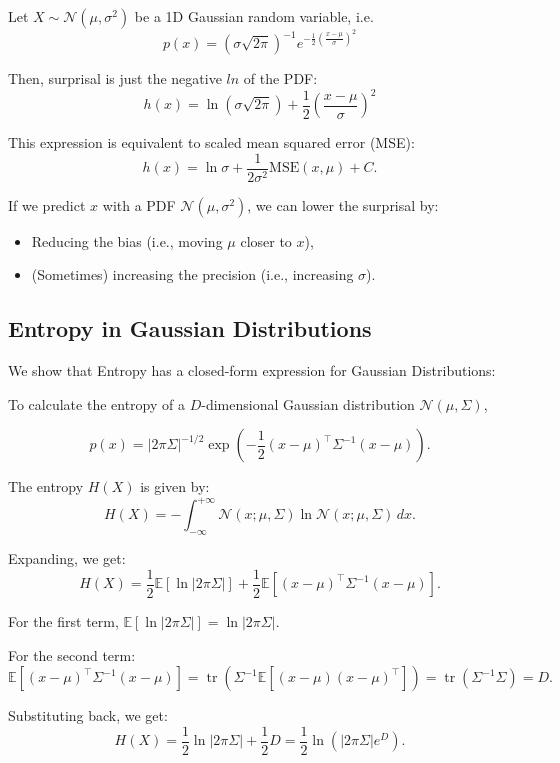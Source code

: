 Let \( X \sim \mathcal{N}(\mu, \sigma^2) \) be a 1D Gaussian random variable, i.e.
\[
p(x) = \left( \sigma \sqrt{2 \pi} \right)^{-1} e^{-\frac{1}{2} \left( \frac{x - \mu}{\sigma} \right)^2}
\]


Then, surprisal is just the negative $ln$ of the PDF:
\[
h(x) = \ln \left( \sigma \sqrt{2 \pi} \right) + \frac{1}{2} \left( \frac{x - \mu}{\sigma} \right)^2
\]

This expression is equivalent to scaled mean squared error (MSE):
\[
h(x) = \ln \sigma + \frac{1}{2 \sigma^2} \text{MSE}(x, \mu) + C.
\]

If we predict \( x \) with a PDF \( \mathcal{N}(\mu, \sigma^2) \), we can lower the surprisal by:

\begin{itemize}
    \item Reducing the bias (i.e., moving \( \mu \) closer to \( x \)),
    \item (Sometimes) increasing the precision (i.e., increasing \( \sigma \)).
\end{itemize}


\subsection{Entropy in Gaussian Distributions}

We show that Entropy has a closed-form expression for Gaussian Distributions:

To calculate the entropy of a \(D\)-dimensional Gaussian distribution \(\mathcal{N}(\mu, \Sigma)\),

\[
p(x) = |2 \pi \Sigma|^{-1/2} \exp \left( -\frac{1}{2} (x - \mu)^\top \Sigma^{-1} (x - \mu) \right).
\]

The entropy \(H(X)\) is given by:
\[
H(X) = - \int_{-\infty}^{+\infty} \mathcal{N}(x; \mu, \Sigma) \ln \mathcal{N}(x; \mu, \Sigma) \, dx.
\]

Expanding, we get:
\[
H(X) = \frac{1}{2} \mathbb{E}[\ln |2 \pi \Sigma|] + \frac{1}{2} \mathbb{E}[(x - \mu)^\top \Sigma^{-1} (x - \mu)].
\]

For the first term, \(\mathbb{E}[\ln |2 \pi \Sigma|] = \ln |2 \pi \Sigma|\).

For the second term:
\[
\mathbb{E} \left[ (x - \mu)^\top \Sigma^{-1} (x - \mu) \right] = \operatorname{tr} \left( \Sigma^{-1} \mathbb{E} \left[ (x - \mu)(x - \mu)^\top \right] \right) = \operatorname{tr}(\Sigma^{-1} \Sigma) = D.
\]

Substituting back, we get:
\[
H(X) = \frac{1}{2} \ln |2 \pi \Sigma| + \frac{1}{2} D = \frac{1}{2} \ln \left( |2 \pi \Sigma| e^D \right).
\]

